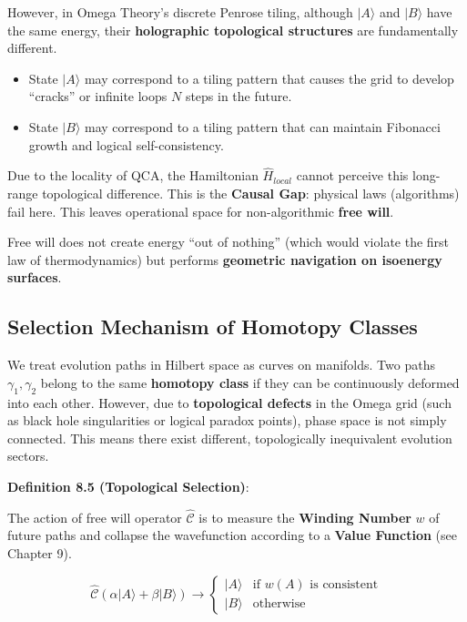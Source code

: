 However, in Omega Theory's discrete Penrose tiling, although $|A\rangle$ and $|B\rangle$ have the same energy, their \textbf{holographic topological structures} are fundamentally different.

\begin{itemize}
\item State $|A\rangle$ may correspond to a tiling pattern that causes the grid to develop ``cracks'' or infinite loops $N$ steps in the future.
\item State $|B\rangle$ may correspond to a tiling pattern that can maintain Fibonacci growth and logical self-consistency.
\end{itemize}

Due to the locality of QCA, the Hamiltonian $\hat{H}_{local}$ cannot perceive this long-range topological difference. This is the \textbf{Causal Gap}: physical laws (algorithms) fail here. This leaves operational space for non-algorithmic \textbf{free will}.

Free will does not create energy ``out of nothing'' (which would violate the first law of thermodynamics) but performs \textbf{geometric navigation on isoenergy surfaces}.

\subsection{Selection Mechanism of Homotopy Classes}

We treat evolution paths in Hilbert space as curves on manifolds. Two paths $\gamma_1, \gamma_2$ belong to the same \textbf{homotopy class} if they can be continuously deformed into each other.
However, due to \textbf{topological defects} in the Omega grid (such as black hole singularities or logical paradox points), phase space is not simply connected. This means there exist different, topologically inequivalent evolution sectors.

\textbf{Definition 8.5 (Topological Selection)}:

The action of free will operator $\hat{\mathcal{C}}$ is to measure the \textbf{Winding Number} $w$ of future paths and collapse the wavefunction according to a \textbf{Value Function} (see Chapter 9).

\[\hat{\mathcal{C}} \left( \alpha |A\rangle + \beta |B\rangle \right) \to \begin{cases} |A\rangle & \text{if } w(A) \text{ is consistent} \\ |B\rangle & \text{otherwise} \end{cases}\]

